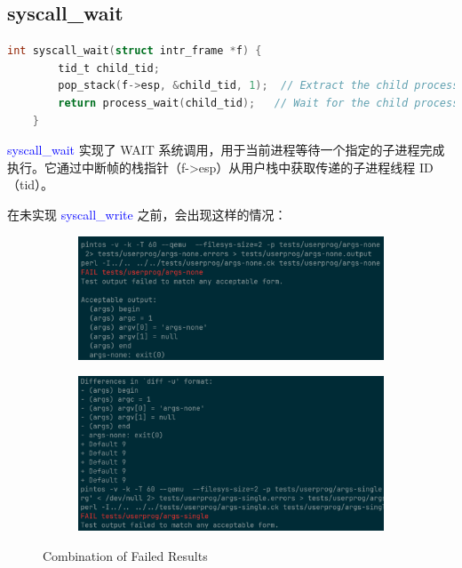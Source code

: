 \documentclass[14pt,a4paper,UTF8,twoside]{article}
\renewcommand{\texttt}[1]{\textcolor{blue}{\ttfamily #1}}
\begin{document}
\subsection{syscall\_wait}

\begin{lstlisting}[language=C, title= syscall\_wait()]
    int syscall_wait(struct intr_frame *f) {
        tid_t child_tid;
        pop_stack(f->esp, &child_tid, 1);  // Extract the child process ID from the user stack.
        return process_wait(child_tid);   // Wait for the child process and return its exit status.
    }
\end{lstlisting}

\begin{ctt}
    \texttt{syscall\_wait} 实现了 WAIT 系统调用，用于当前进程等待一个指定的子进程完成执行。它通过中断帧的栈指针（f->esp）从用户栈中获取传递的子进程线程 ID（tid）。
\end{ctt}



在未实现 \texttt{syscall\_write} 之前，会出现这样的情况：

\begin{figure}[H]
    \centering
    \begin{subfigure}[b]{0.45\textwidth}
        \centering
        \includegraphics[width=\textwidth]{img5/failed1.png}
        \label{fig:failed1}
    \end{subfigure}
    \hfill
    \begin{subfigure}[b]{0.45\textwidth}
        \centering
        \includegraphics[width=\textwidth]{img5/failed2.png}
        \label{fig:failed2}
    \end{subfigure}
    \caption{Combination of Failed Results}
    \label{fig:failed_results}
\end{figure}
\end{document}
